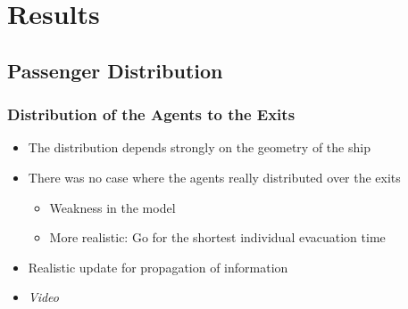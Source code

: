 \documentclass{beamer}
\begin{document}


\section{Results}

\subsection{Passenger Distribution}
\begin{frame}
	\frametitle{Distribution of the Agents to the Exits}
	\begin{itemize}
		\item The distribution depends strongly on the geometry of the ship
		\item There was no case where the agents really distributed over the exits
		\begin{itemize}
			\item Weakness in the model
			\item More realistic: Go for the shortest individual evacuation time
		\end{itemize}
		\item Realistic update for propagation of information
		\item \emph{Video}
	\end{itemize}
\end{frame}
\end{document}
